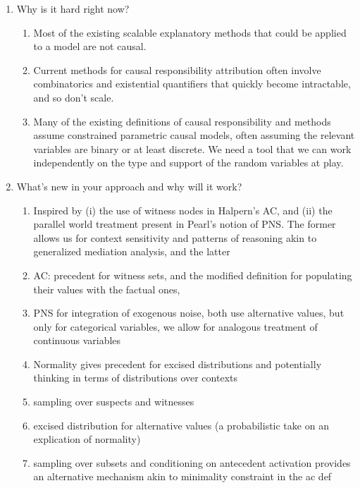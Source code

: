 \documentclass{article}
\begin{document}
\begin{enumerate}
\begin{enumerate}
        \item Causal responsibility attribution is important: for example, we might want to understand why an adverse outcome occurred, in order to prevent it from happening again later; or we might want to understand exactly how and why a predicted, counterfactual positive outcome can be brought about.
    \end{enumerate}
    \item Why is it hard right now?
    \begin{enumerate}
        \item Most of the existing scalable explanatory methods that could be applied to a model are not causal.
        \item Current methods for causal responsibility attribution often involve combinatorics and existential quantifiers that quickly become intractable, and so don't scale.
        \item Many of the existing definitions of causal responsibility and methods assume constrained parametric causal models, often assuming the relevant variables are binary or at least discrete. We need a tool that we can work independently on the type and support of the random variables at play. 
    \end{enumerate}
    \item What's new in your approach and why will it work?
    \begin{enumerate}
    \item Inspired by (i) the use of witness nodes in Halpern's AC, and (ii) the parallel world treatment present in Pearl's notion of PNS. The former allows us for context sensitivity and patterns of reasoning akin to generalized mediation analysis, and the latter
    \item AC: precedent for witness sets, and the modified definition for populating their values with the factual ones,  
    \item PNS for integration of exogenous noise, both use alternative values, but only for categorical variables, we allow for analogous treatment of continuous variables
    \item Normality gives precedent for excised distributions and potentially thinking in terms of distributions over contexts 
    \item sampling over suspects and witnesses
    \item excised distribution for alternative values (a probabilistic take on an explication of normality)
    \item sampling over subsets and conditioning on antecedent activation provides an alternative mechanism akin to minimality constraint in the ac def

\end{enumerate}
\end{enumerate}
\end{document}
